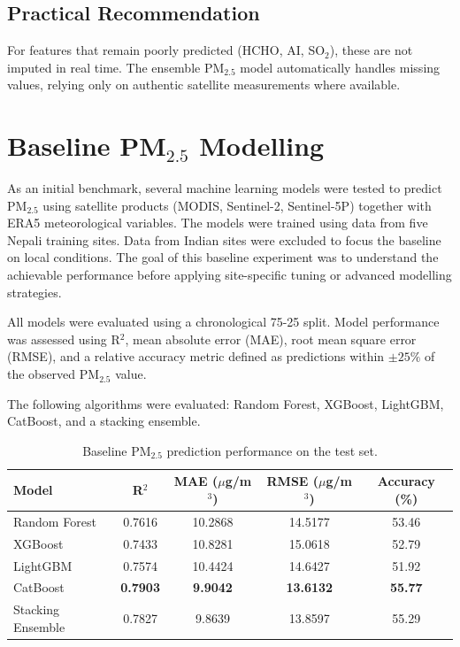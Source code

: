 \documentclass[12pt]{report}
\begin{document}
\subsection*{Practical Recommendation}

For features that remain poorly predicted (HCHO, AI, SO$_2$), these are not imputed in real time. The ensemble PM$_{2.5}$ model automatically handles missing values, relying only on authentic satellite measurements where available.

\section{Baseline PM$_{2.5}$ Modelling}

As an initial benchmark, several machine learning models were tested to predict PM$_{2.5}$ using satellite products (MODIS, Sentinel-2, Sentinel-5P) together with ERA5 meteorological variables. The models were trained using data from five Nepali training sites. Data from Indian sites were excluded to focus the baseline on local conditions. The goal of this baseline experiment was to understand the achievable performance before applying site-specific tuning or advanced modelling strategies.

All models were evaluated using a chronological 75-25 split. Model performance was assessed using R$^2$, mean absolute error (MAE), root mean square error (RMSE), and a relative accuracy metric defined as predictions within $\pm25\%$ of the observed PM$_{2.5}$ value.

The following algorithms were evaluated: Random Forest, XGBoost, LightGBM, CatBoost, and a stacking ensemble.

\begin{table}[h!]
\centering
\caption{Baseline PM$_{2.5}$ prediction performance on the test set.}
\label{tab:pm25_baseline}
\vspace{0.3cm}
\begin{tabular}{|l|c|c|c|c|}
\hline
\textbf{Model} & \textbf{R$^2$} & \textbf{MAE ($\mu$g/m$^3$)} & \textbf{RMSE ($\mu$g/m$^3$)} & \textbf{Accuracy (\%)} \\
\hline
Random Forest & 0.7616 & 10.2868 & 14.5177 & 53.46 \\
\hline
XGBoost & 0.7433 & 10.8281 & 15.0618 & 52.79 \\
\hline
LightGBM & 0.7574 & 10.4424 & 14.6427 & 51.92 \\
\hline
CatBoost & \textbf{0.7903} & \textbf{9.9042} & \textbf{13.6132} & \textbf{55.77} \\
\hline
Stacking Ensemble & 0.7827 & 9.8639 & 13.8597 & 55.29 \\
\hline
\end{tabular}
\end{table}
\end{document}
